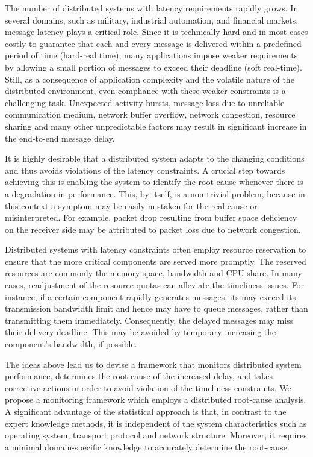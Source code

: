 \documentclass[times, 10pt,twocolumn]{article}
\begin{document}
The number of distributed systems with latency requirements rapidly grows.
In several domains, such as military, industrial automation, and financial markets, message latency plays a critical role. Since it is technically hard and in most cases costly to guarantee that each and every message is delivered within a predefined period of time
(hard-real time), many applications impose weaker requirements by allowing a small portion of messages to exceed their deadline (soft real-time).
Still, as a consequence of application complexity and the volatile nature of the distributed environment, even compliance with these weaker
constraints is a challenging task. Unexpected activity bursts,  message loss due to unreliable communication medium, network buffer overflow,
network congestion, resource sharing and many other unpredictable factors may result in significant increase in the end-to-end message delay.

It is highly desirable that a distributed system adapts to the changing conditions and thus avoids violations of the latency constraints. A crucial step towards achieving this is enabling the system to identify the root-cause whenever there is a degradation in performance. This, by itself, is a non-trivial problem, because in this context a symptom may be easily mistaken for the real cause or misinterpreted. For example, packet drop resulting from
buffer space deficiency on the receiver side may be attributed to packet loss due to network congestion.

Distributed systems with latency constraints often employ resource reservation to ensure that the more critical components are served more promptly. The reserved resources are commonly the memory space, bandwidth and CPU share. In many cases, readjustment of the resource quotas can alleviate the timeliness issues. For instance, if a certain component rapidly generates messages, its may exceed its transmission bandwidth limit
and hence may have to queue messages, rather than transmitting them immediately. Consequently, the delayed messages may miss their delivery deadline. This may be avoided by temporary increasing the component's bandwidth, if possible.

The ideas above lead us to devise a framework that monitors distributed system performance, determines the root-cause of the increased delay, and takes corrective actions in order to avoid violation of the timeliness constraints.  We propose a monitoring framework which employs a distributed root-cause analysis. A significant advantage of the statistical approach is that, in contrast to the expert knowledge methods, it is independent of the system characteristics such as operating system, transport protocol and network structure. Moreover, it requires a minimal domain-specific knowledge to accurately determine the root-cause.
\end{document}
